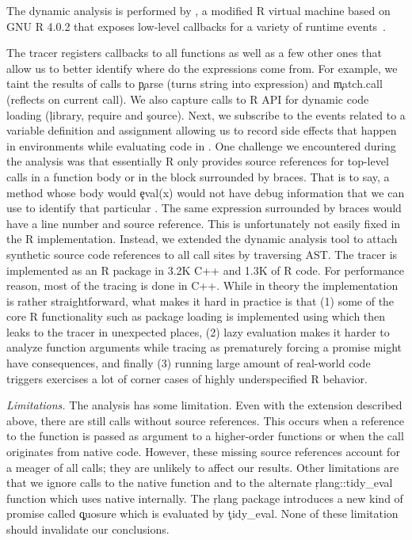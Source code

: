 \documentclass[screen,acmsmall]{acmart}
\newcommand{\mypara}[1]{\medskip\noindent\emph{#1}\xspace}
\begin{document}
The dynamic analysis is performed by \rdyntrace, a modified R virtual machine
based on GNU R 4.0.2 that exposes low-level callbacks for a variety of runtime
events~\cite{oopsla19b}.

The tracer registers callbacks to all \eval functions as well as a few other
ones that allow us to better identify where do the expressions come from. For
example, we taint the results of calls to \c{parse} (turns string into
expression) and \c{match.call} (reflects on current call). We also capture calls
to R API for dynamic code loading (\eg\xspace \c{library}, \c{require} and
\c{source}). Next, we subscribe to the events related to a variable definition
and assignment allowing us to record side effects that happen in environments
while evaluating code in \eval. One challenge we encountered during the analysis
was that essentially R only provides source references for top-level calls in a
function body or in the block surrounded by braces. That is to say, a method
whose body would \c{eval(x)} would not have debug information that we can use to
identify that particular \eval. The same expression surrounded by braces would
have a line number and source reference. This is unfortunately not easily fixed
in the R implementation. Instead, we extended the dynamic analysis tool to
attach synthetic source code references to all \eval call sites by traversing
AST. The tracer is implemented as an R package in 3.2K C++ and 1.3K of R code.
For performance reason, most of the tracing is done in C++. While in theory the
implementation is rather straightforward, what makes it hard in practice is that
(1) some of the core R functionality such as package loading is implemented
using \eval which then leaks to the tracer in unexpected places, (2) lazy
evaluation makes it harder to analyze function arguments while tracing as
prematurely forcing a promise might have consequences, and finally (3) running
large amount of real-world code triggers exercises a lot of corner cases of
highly underspecified R behavior.

\mypara{Limitations.} The analysis has some limitation. Even with the extension
described above, there are still \PkgUndefinedRnd \eval calls without source
references. This occurs when a reference to the \eval function is passed as
argument to a higher-order functions or when the \eval call originates from
native code. However, these missing source references account for a meager
\PkgUndefinedRatio of all calls; they are unlikely to affect our results. Other
limitations are that we ignore calls to the native \eval function and to the
alternate \c{rlang::tidy\_eval} function which uses native \eval internally.
The \c{rlang} package introduces a new kind of promise called \c{quosure} which
is evaluated by \c{tidy\_eval}. None of these limitation should invalidate our
conclusions.
\end{document}
